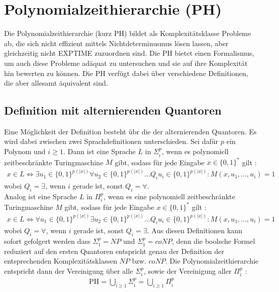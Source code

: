 \chapter{Polynomialzeithierarchie (PH)} \label{chapter: Polynomialzeithierarchie (PH)}
Die Polynomialzeithierarchie (kurz PH) bildet als Komplexitätsklasse Probleme ab, die sich nicht effizient mittels Nichtdeterminusmus lösen lassen, aber gleichzeitig 
nicht EXPTIME zuzuordnen sind. Die PH bietet einen Formalismus, um auch diese Probleme adäquat zu untersuchen und sie auf ihre Komplexität hin bewerten zu können.
Die PH verfügt dabei über verschiedene Definitionen, die aber allesamt äquivalent sind.


\section{Definition mit alternierenden Quantoren} \label{section: Definition PH mit alternierenden Quantoren}
Eine Möglichkeit der Definition besteht übr die der alternierenden Quantoren. Es wird dabei zwischen zwei Sprachdefinitionen unterschieden.
Sei dafür $p$ ein Polynom und $i \geq 1$. Dann ist eine Sprache $L$ in $\Sigma^p_i$, wenn es polynomiell zeitbeschränkte Turingmaschine $M$ gibt, 
sodass für jede Eingabe $x \in \{0,1\}^*$ gilt \cite{rossman_complexity_2015}:
\begin{align*}
    x \in L \Leftrightarrow \exists u_1 \in \{0,1\}^{p(|x|)} \forall u_2 \in \{0,1\}^{p(|x|)} ... Q_i u_i \in \{0,1\}^{p(|x|)} : M(x, u_1, ..., u_i) = 1
\end{align*}
wobei $Q_i = \exists$, wenn $i$ gerade ist, sonst $Q_i = \forall$. \\
Analog ist eine Sprache $L$ in $\Pi^p_i$, wenn es eine polynomiell zeitbeschränkte Turingmaschine $M$ gibt, sodass für jede Eingabe $x \in \{0,1\}^*$ gilt \cite{arora_computational_2009}:
\begin{align*}
    x \in L \Leftrightarrow \forall u_1 \in \{0,1\}^{p(|x|)} \exists u_2 \in \{0,1\}^{p(|x|)} ... Q_i u_i \in \{0,1\}^{p(|x|)} : M(x, u_1, ..., u_i) = 1
\end{align*}
wobei $Q_i = \forall$, wenn $i$ gerade ist, sonst $Q_i = \exists$.
Aus diesen Definitionen kann sofort gefolgert werden dass $\Sigma^p_1 = NP$ und $\Sigma^p_1 = coNP$, denn die boolsche Formel reduziert auf 
den ersten Quantoren entspricht genau der Definition der entsprechenden Komplexitätsklassen $NP$ bzw. $coNP$.
Die Polynomialzeithierarchie entspricht dann der Vereinigung über alle $\Sigma^p_i$, sowie der Vereinigung aller $\Pi^p_i$ \cite{sipser_introduction_2012}:
\begin{align*}
    \text{PH} = \bigcup_{i \geq 1} \Sigma^p_i = \bigcup_{i \geq 1} \Pi^p_i 
\end{align*}
